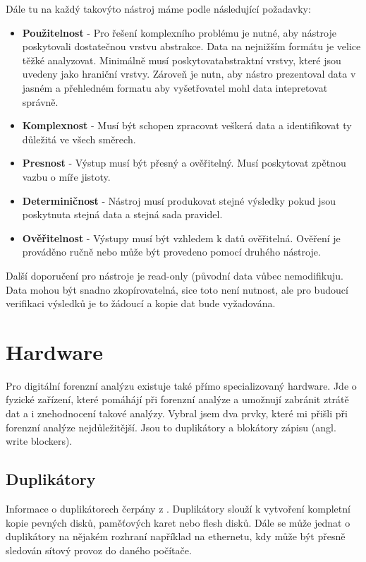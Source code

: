 \documentclass[thesis=B,czech]{FITthesis}[2012/06/26]
\begin{document}
Dále tu na každý takovýto nástroj máme podle \cite{for_need} následující požadavky:

\begin{itemize}
\item \textbf{Použitelnost} - Pro řešení komplexního problému je nutné, aby nástroje poskytovali dostatečnou vrstvu abstrakce. Data na nejnižším formátu je velice těžké analyzovat. Minimálně musí poskytovatabstraktní vrstvy, které jsou uvedeny jako hraniční vrstvy. Zároveň je nutn, aby nástro prezentoval data v jasném a přehledném formatu aby vyšetřovatel mohl data intepretovat správně. \cite{carrier2003defining}
\item \textbf{Komplexnost} - Musí být schopen zpracovat veškerá data a identifikovat ty důležitá ve všech směrech.
\item \textbf{Presnost} - Výstup musí být přesný a ověřitelný. Musí poskytovat zpětnou vazbu o míře jistoty.
\item \textbf{Determiničnost} - Nástroj musí produkovat stejné výsledky pokud jsou poskytnuta stejná data a stejná sada pravidel.
\item \textbf{Ověřitelnost} - Výstupy musí být vzhledem k datů ověřitelná. Ověření je prováděno ručně nebo může být provedeno pomocí druhého nástroje.
\end{itemize}

Další doporučení pro nástroje je read-only (původní data vůbec nemodifikuju. Data mohou být snadno zkopírovatelná, sice toto není nutnost, ale pro budoucí verifikaci výsledků je to žádoucí a kopie dat bude vyžadována. 


\section{Hardware}
Pro digitální forenzní analýzu existuje také přímo specializovaný hardware. Jde o fyzické zařízení, které pomáhájí při forenzní analýze a umožnují zabránit ztrátě dat a i znehodnocení takové analýzy. Vybral jsem dva prvky, které mi přišli při forenzní analýze nejdůležitější. Jsou to duplikátory a blokátory zápisu (angl. write blockers).

\subsection{Duplikátory}
Informace o duplikátorech čerpány z \cite{for_hard}. Duplikátory slouží k vytvoření kompletní kopie pevných disků, paměťových karet nebo flesh disků. Dále se může jednat o duplikátory na nějakém rozhraní například na ethernetu, kdy může být přesně sledován sítový provoz do daného počítače.
\end{document}
